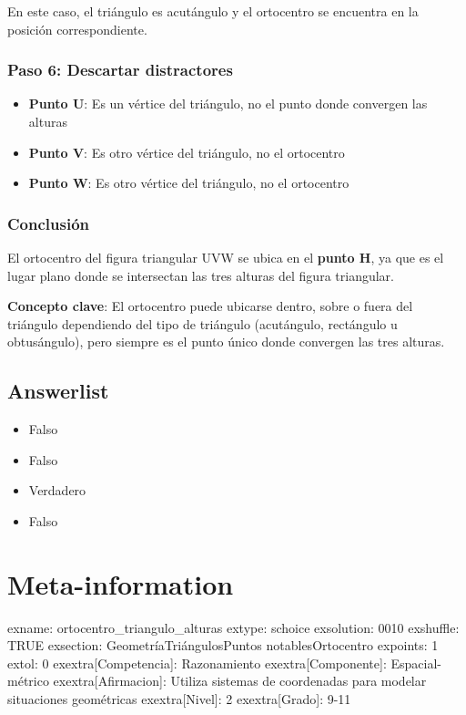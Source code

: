 \documentclass[
]{article}
\providecommand{\tightlist}{%
  \setlength{\itemsep}{0pt}\setlength{\parskip}{0pt}}
\begin{document}
En este caso, el triángulo es acutángulo y el ortocentro se encuentra en
la posición correspondiente.

\subsubsection{Paso 6: Descartar
distractores}\label{paso-6-descartar-distractores}

\begin{itemize}
\tightlist
\item
  \textbf{Punto U}: Es un vértice del triángulo, no el punto donde
  convergen las alturas
\item
  \textbf{Punto V}: Es otro vértice del triángulo, no el ortocentro
\item
  \textbf{Punto W}: Es otro vértice del triángulo, no el ortocentro
\end{itemize}

\subsubsection{Conclusión}\label{conclusiuxf3n}

El ortocentro del figura triangular UVW se ubica en el \textbf{punto H},
ya que es el lugar plano donde se intersectan las tres alturas del
figura triangular.

\textbf{Concepto clave}: El ortocentro puede ubicarse dentro, sobre o
fuera del triángulo dependiendo del tipo de triángulo (acutángulo,
rectángulo u obtusángulo), pero siempre es el punto único donde
convergen las tres alturas.

\subsection{Answerlist}\label{answerlist-1}

\begin{itemize}
\tightlist
\item
  Falso
\item
  Falso
\item
  Verdadero
\item
  Falso
\end{itemize}

\section{Meta-information}\label{meta-information}

exname: ortocentro\_triangulo\_alturas extype: schoice exsolution: 0010
exshuffle: TRUE exsection: Geometría\textbar Triángulos\textbar Puntos
notables\textbar Ortocentro expoints: 1 extol: 0
exextra{[}Competencia{]}: Razonamiento exextra{[}Componente{]}:
Espacial-métrico exextra{[}Afirmacion{]}: Utiliza sistemas de
coordenadas para modelar situaciones geométricas exextra{[}Nivel{]}: 2
exextra{[}Grado{]}: 9-11
\end{document}
